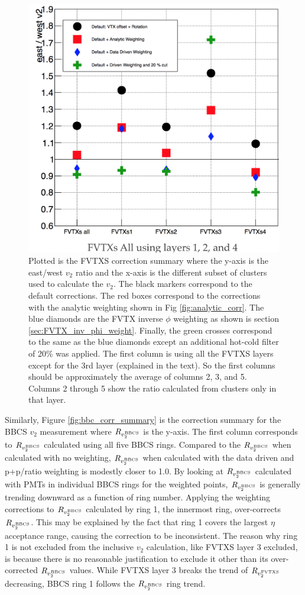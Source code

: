 \begin{figure}[!h]
\begin{center}
\includegraphics[width=0.5\linewidth]{figs/fvtx_correction_summary.png}
\caption{Plotted is the FVTXS correction summary where the y-axis is the east/west $v_2$ ratio and the x-axis is the different subset of clusters used to calculate the $v_2$. The black markers correspond to the default corrections. The red boxes correspond to the corrections with the analytic weighting shown in Fig \ref{fig:analytic_corr}. The blue diamonds are the FVTX inverse $\phi$ weighting as shown is section \ref{sec:FVTX_inv_phi_weight}. Finally, the green crosses correspond to the same as the blue diamonds except an additional hot-cold filter of 20\% was applied. The first column is using all the FVTXS layers except for the 3rd layer (explained in the text). So the first columns should be approximately the average of columns 2, 3, and 5. Columns 2 through 5 show the ratio calculated from clusters only in that layer.}
\label{fig:fvtx_corr_summary}
\end{center}
\end{figure}

Similarly, Figure \ref{fig:bbc_corr_summary} is the correction summary for the BBCS $v_2$ measurement where $R_{v_2^{\rm BBCS}}$ is the y-axis. The first column corresponds to $R_{v_2^{\rm BBCS}}$ calculated using all five BBCS rings. Compared to the $R_{v_2^{\rm BBCS}}$ when calculated with no weighting, $R_{v_2^{\rm BBCS}}$ when calculated with the data driven and p+p/\pau ratio weighting is modestly closer to 1.0. By looking at $R_{v_2^{\rm BBCS}}$ calculated with PMTs in individual BBCS rings for the weighted points, $R_{v_2^{\rm BBCS}}$ is generally trending downward as a function of ring number. Applying the weighting corrections to $R_{v_2^{\rm BBCS}}$ calculated by ring 1, the innermost ring, over-corrects $R_{v_2^{\rm BBCS}}$. This may be explained by the fact that ring 1 covers the largest $\eta$ acceptance range, causing the correction to be inconsistent. The reason why ring 1 is not excluded from the inclusive $v_2$ calculation, like FVTXS layer 3 excluded, is because there is no reasonable justification to exclude it other than its over-corrected $R_{v_2^{\rm BBCS}}$ values. While FVTXS layer 3 breaks the trend of $R_{v_2^{\rm FVTXS}}$ decreasing, BBCS ring 1 follows the $R_{v_2^{\rm BBCS}}$ ring trend.

